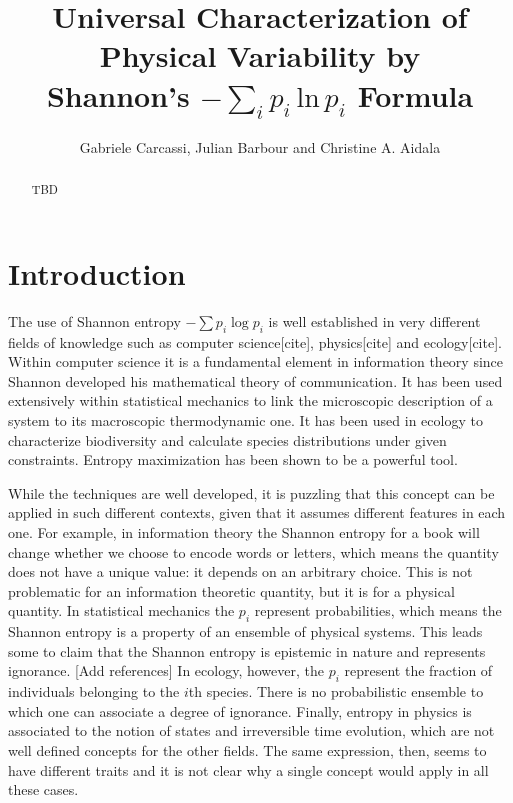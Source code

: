 \documentclass{article}
\title{Universal Characterization of Physical Variability by \\Shannon's $-\sum_ip_i\,\textrm{ln}\,p_i$ Formula}
\author{
	Gabriele Carcassi,
	Julian Barbour and
	Christine A. Aidala 
}
\begin{document}
\maketitle


\begin{abstract}
TBD
\end{abstract}




\section{Introduction\label{int}}

The use of Shannon entropy $-\sum p_i \log p_i$ is well established in very different fields of knowledge such as computer science[cite], physics[cite] and ecology[cite]. Within computer science it is a fundamental element in information theory since Shannon developed his mathematical theory of communication. It has been used extensively within statistical mechanics to link the microscopic description of a system to its macroscopic thermodynamic one. It has been used in ecology to characterize biodiversity and calculate species distributions under given constraints. Entropy maximization has been shown to be a powerful tool.

While the techniques are well developed, it is puzzling that this concept can be applied in such different contexts, given that it assumes different features in each one. For example, in information theory the Shannon entropy for a book will change whether we choose to encode words or letters, which means the quantity does not have a unique value: it depends on an arbitrary choice. This is not problematic for an information theoretic quantity, but it is for a physical quantity. In statistical mechanics the $p_i$ represent probabilities, which means the Shannon entropy is a property of an ensemble of physical systems. This leads some to claim that the Shannon entropy is epistemic in nature and represents ignorance. [Add references] In ecology, however, the $p_i$ represent the fraction of individuals belonging to the $i$th species. There is no probabilistic ensemble to which one can associate a degree of ignorance. Finally, entropy in physics is associated to the notion of states and irreversible time evolution, which are not well defined concepts for the other fields. The same expression, then, seems to have different traits and it is not clear why a single concept would apply in all these cases.
\end{document}
